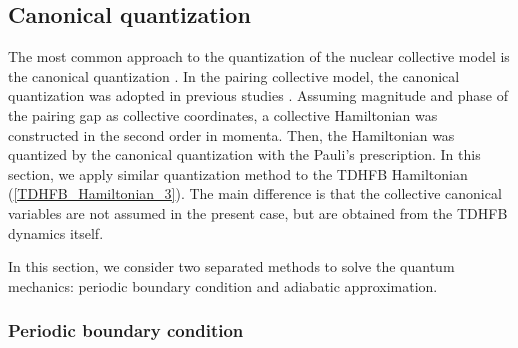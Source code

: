 \documentclass[%
superscriptaddress,
preprint,
showpacs,
nofootinbib,
amsmath,amssymb,
prc,
floatfix ]%
{revtex4-1}
\begin{document}
\subsection{Canonical quantization}
\label{sec:canonical}

The most common approach to the quantization of the nuclear collective model
is the canonical quantization \cite{BM75}.
In the pairing collective model, the canonical quantization
was adopted in previous studies \cite{BBPK70,delta1,delta3}.
Assuming magnitude and phase of the pairing gap as collective coordinates,
a collective Hamiltonian was constructed in the second order in momenta.
Then, the Hamiltonian was quantized by the canonical quantization
with the Pauli's prescription.
In this section, we apply similar quantization method to
the TDHFB Hamiltonian (\ref{TDHFB_Hamiltonian_3}).
The main difference is that the collective canonical variables are
not assumed in the present case, but are obtained from the TDHFB dynamics
itself.\par
In this section, we consider two separated methods to solve the quantum mechanics: periodic boundary condition and adiabatic approximation. 

\subsubsection{Periodic boundary condition}
\label{subsec:canonical1}
\end{document}
